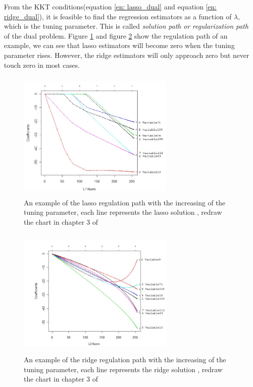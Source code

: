From the KKT conditions(equation \ref{en: lasso_dual} and equation \ref{en: ridge_dual}),  it is feasible to find the regression estimators as a function of $\lambda$,  which is the tuning parameter. This is called \textit{solution path or regularization path} of the dual problem. Figure \ref{fig:lasso_path} and figure \ref{fig: ridge_path} show the regulation path of an example,  we can see that lasso estimators will become zero when the tuning parameter rises. However,  the ridge estimators will only approach zero but never touch zero in most cases. 


\begin{figure}[!htb]
	\begin{center}
		\includegraphics[width=3in, height=2.5in]{figures/lasso_p.jpg}
	\end{center}
	\caption{An example of the lasso regulation path with the increasing of the tuning parameter,  each line represents the lasso solution ,  redraw the chart in chapter 3 of \cite{friedman2001elements}} \label{fig:lasso_path}
\end{figure}

\begin{figure}[!htb]
	\begin{center}
		\includegraphics[width=3in, height=2.5in]{figures/ridge_p.jpg}
	\end{center}
	\caption{An example of the ridge regulation path with the increasing of the tuning parameter,  each line represents the ridge solution ,  redraw the chart in chapter 3 of  \cite{friedman2001elements}} \label{fig: ridge_path}
\end{figure}

